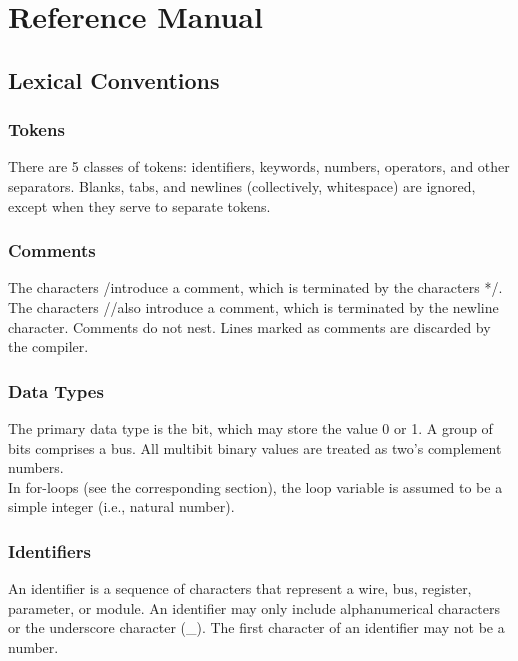 \documentclass[letterpaper,11pt]{article}
\begin{document}
\section{Reference Manual}
    \subsection{Lexical Conventions}
        \subsubsection{Tokens}
        There are 5 classes of tokens: identifiers, keywords, numbers, operators, and other separators.
        Blanks, tabs, and newlines (collectively, whitespace) are ignored, except when they serve
        to separate tokens.
        \subsubsection{Comments}
        The characters \slash* introduce a comment, which is terminated by the characters *\slash.\\
        The characters \slash\slash also introduce a comment, which is terminated by the newline character. Comments do not 
        nest. Lines marked as comments are discarded by the compiler.
        \subsubsection{Data Types}
        The primary data type is the bit, which may store the value 0 or 1. A group of bits comprises a bus. All 
        multibit binary values are treated as two’s complement numbers.\\
        \indent In for-loops (see the corresponding section), the loop variable is assumed to be a simple integer (i.e., 
        natural number).
        \subsubsection{Identifiers}
        An identifier is a sequence of characters that represent a wire, bus, register, parameter, or module. An 
        identifier may only include alphanumerical characters or the underscore character (\_). The first character 
        of an identifier may not be a number.
\end{document}
